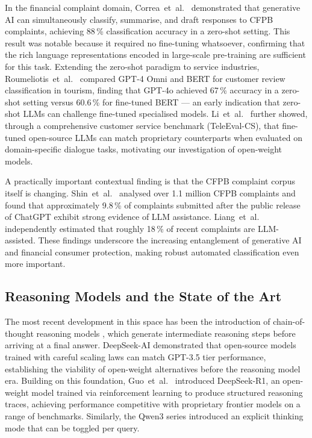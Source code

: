 \documentclass[journal]{IEEEtran}
\begin{document}
In the financial complaint domain, Correa~et~al.\ \cite{correa2024genai}
demonstrated that generative AI can simultaneously classify, summarise,
and draft responses to CFPB complaints, achieving 88\,\% classification
accuracy in a zero-shot setting. This result was notable because it
required no fine-tuning whatsoever, confirming that the rich language
representations encoded in large-scale pre-training are sufficient for
this task. Extending the zero-shot paradigm to service industries,
Roumeliotis~et~al.\ \cite{roumeliotis2024tourism} compared GPT-4 Omni
and BERT for customer review classification in tourism, finding that
GPT-4o achieved 67\,\% accuracy in a zero-shot setting versus 60.6\,\%
for fine-tuned BERT — an early indication that zero-shot LLMs can
challenge fine-tuned specialised models. Li~et~al.\
\cite{li2024customerservice} further showed, through a comprehensive
customer service benchmark (TeleEval-CS), that fine-tuned open-source
LLMs can match proprietary counterparts when evaluated on
domain-specific dialogue tasks, motivating our investigation of
open-weight models.

A practically important contextual finding is that the CFPB complaint
corpus itself is changing. Shin~et~al.\ \cite{shin2025llmwritten}
analysed over 1.1 million CFPB complaints and found that approximately
9.8\,\% of complaints submitted after the public release of ChatGPT
exhibit strong evidence of LLM assistance. Liang~et~al.\
\cite{liang2025cfpb} independently estimated that roughly 18\,\% of
recent complaints are LLM-assisted. These findings underscore the
increasing entanglement of generative AI and financial consumer
protection, making robust automated classification even more important.

\subsection{Reasoning Models and the State of the Art}

The most recent development in this space has been the introduction of
chain-of-thought reasoning models \cite{wei2022chainofthought}, which
generate intermediate reasoning steps before arriving at a final answer.
DeepSeek-AI \cite{deepseekllm2024} demonstrated that open-source models
trained with careful scaling laws can match GPT-3.5 tier performance,
establishing the viability of open-weight alternatives before the
reasoning model era. Building on this foundation, Guo~et~al.\
\cite{guo2025deepseekr1} introduced DeepSeek-R1, an open-weight model
trained via reinforcement learning to produce structured reasoning
traces, achieving performance competitive with proprietary frontier
models on a range of benchmarks. Similarly, the
Qwen3 series \cite{qwen2025qwen3} introduced an explicit thinking mode
that can be toggled per query.
\end{document}
